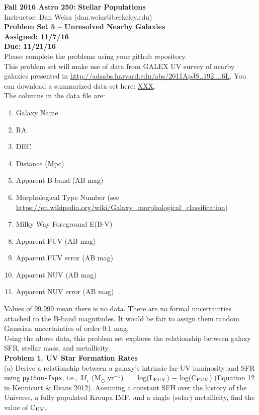\documentclass{article}
\begin{document}
\noindent \textbf{\large{Fall 2016 Astro 250: Stellar Populations}} \\
\noindent Instructor: Dan Weisz (dan.weisz@berkeley.edu) \\
\textbf{\large{Problem Set 5 -- Unresolved Nearby Galaxies}} \\
\textbf{{Assigned: 11/7/16}} \\
\textbf{{Due: 11/21/16}} \\

Please complete the problems using your github repository. \\

This problem set will make use of data from GALEX UV survey of nearby galaxies presented in \url{http://adsabs.harvard.edu/abs/2011ApJS..192....6L}.  You can download a summarized data set here: \url{XXX}. \\

\noindent The columns in the data file are: 

\begin{enumerate}
\item Galaxy Name
\item RA
\item DEC
\item Distance (Mpc)
\item Apparent B-band (AB mag)
\item Morphological Type Number (see \url{https://en.wikipedia.org/wiki/Galaxy_morphological_classification})
\item Milky Way Foreground E(B-V)
\item Apparent FUV (AB mag)
\item Apparent FUV error (AB mag)
\item Apparent NUV (AB mag)
\item Apparent NUV error (AB mag)
\end{enumerate}

\noindent Values of 99.999 mean there is no data.  There are no formal uncertainties attached to the B-band magnitudes.  It would be fair to assign them random Gaussian uncertainties of order 0.1 mag.\\

\noindent Using the above data, this problem set explores the relationship between galaxy SFR, stellar mass, and metallicity. \\

\noindent \textbf{Problem 1. UV Star Formation Rates} \\

(a) Derive a relationship between a galaxy's intrinsic far-UV luminosity and SFR using \texttt{python-fsps}, i.e., $\dot{M_{\star}}$ (M$_{\odot}$ yr$^{-1}$) $=$ log(L$_{\rm FUV}$) $-$ log(C$_{\rm FUV}$) (Equation 12 in Kennicutt \& Evans 2012).  Assuming a constant SFH over the history of the Universe, a fully populated Kroupa IMF, and a single (solar) metallicity, find the value of C$_{\rm UV}$. \\
\end{document}
